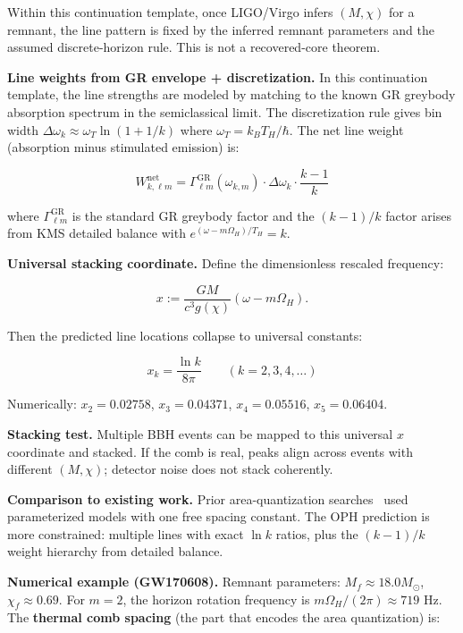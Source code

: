 Within this continuation template, once LIGO/Virgo infers \((M, \chi)\) for a remnant, the line pattern is fixed by the inferred remnant parameters and the assumed discrete-horizon rule. This is not a recovered-core theorem.

\textbf{Line weights from GR envelope + discretization.} In this continuation template, the line strengths are modeled by matching to the known GR greybody absorption spectrum in the semiclassical limit. The discretization rule gives bin width \(\Delta\omega_k \approx \omega_T \ln(1 + 1/k)\) where \(\omega_T = k_B T_H/\hbar\). The net line weight (absorption minus stimulated emission) is:

\[
W^{\mathrm{net}}_{k,\ell m} = \Gamma^{\mathrm{GR}}_{\ell m}(\omega_{k,m}) \cdot \Delta\omega_k \cdot \frac{k-1}{k}
\]

where \(\Gamma^{\mathrm{GR}}_{\ell m}\) is the standard GR greybody factor and the \((k-1)/k\) factor arises from KMS detailed balance with \(e^{(\omega-m\Omega_H)/T_H} = k\).

\textbf{Universal stacking coordinate.} Define the dimensionless rescaled frequency:

\[
x := \frac{GM}{c^3 g(\chi)}(\omega - m\Omega_H).
\]

Then the predicted line locations collapse to universal constants:

\[
x_k = \frac{\ln k}{8\pi} \qquad (k = 2, 3, 4, \ldots)
\]

Numerically: \(x_2 = 0.02758\), \(x_3 = 0.04371\), \(x_4 = 0.05516\), \(x_5 = 0.06404\).

\textbf{Stacking test.} Multiple BBH events can be mapped to this universal \(x\) coordinate and stacked. If the comb is real, peaks align across events with different \((M, \chi)\); detector noise does not stack coherently.

\textbf{Comparison to existing work.} Prior area-quantization searches~\cite{laghi21} used parameterized models with one free spacing constant. The OPH prediction is more constrained: multiple lines with exact \(\ln k\) ratios, plus the \((k-1)/k\) weight hierarchy from detailed balance.

\textbf{Numerical example (GW170608).} Remnant parameters: \(M_f \approx 18.0 M_\odot\), \(\chi_f \approx 0.69\). For \(m = 2\), the horizon rotation frequency is \(m\Omega_H/(2\pi) \approx 719\) Hz. The \textbf{thermal comb spacing} (the part that encodes the area quantization) is:

